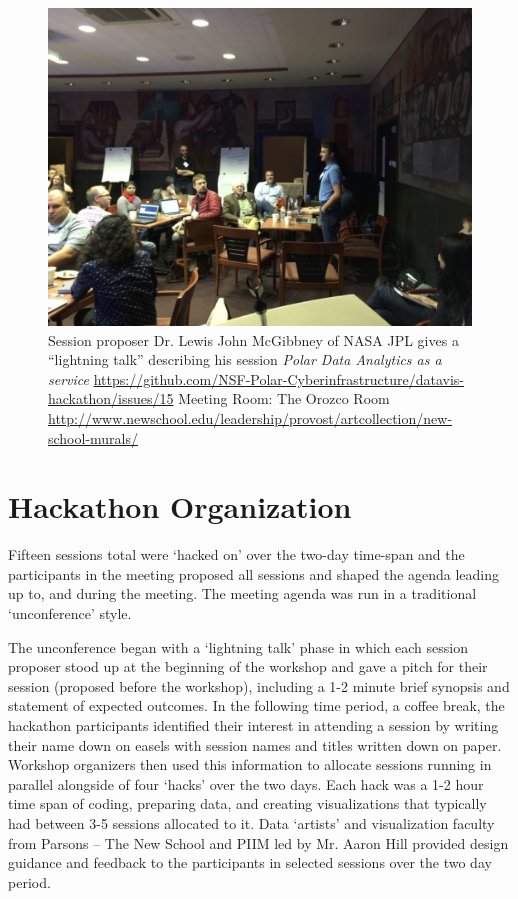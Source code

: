 \documentclass[11pt]{article}
\begin{document}
\begin{figure}[htp]
    \centering
    \includegraphics[width=5in]{figs/fig2.png}
    \caption{Session proposer Dr. Lewis John McGibbney of NASA JPL gives a ``lightning talk'' describing his session {\em Polar Data Analytics as a service} \protect\url{https://github.com/NSF-Polar-Cyberinfrastructure/datavis-hackathon/issues/15} Meeting Room: The Orozco Room \protect\url{http://www.newschool.edu/leadership/provost/artcollection/new-school-murals/}}
    \label{fig:lightning}
\end{figure}


\section{Hackathon Organization}
Fifteen sessions total were `hacked on' over the two-day time-span and the participants in the meeting proposed all sessions and shaped the agenda leading up to, and during the meeting. The meeting agenda was run in a traditional `unconference' style. 

The unconference began with a `lightning talk' phase in which each session proposer stood up at the beginning of the workshop and gave a pitch for their session (proposed before the workshop), including a 1-2 minute brief synopsis and statement of expected outcomes. In the following time period, a coffee break, the hackathon participants identified their interest in attending a session by writing their name down on easels with session names and titles written down on paper. Workshop organizers then used this information to allocate sessions running in parallel alongside of four `hacks' over the two days. Each hack was a 1-2 hour time span of coding, preparing data, and creating visualizations that typically had between 3-5 sessions allocated to it. Data `artists' and visualization faculty from Parsons -- The New School and PIIM led by Mr. Aaron Hill provided design guidance and feedback to the participants in selected sessions over the two day period.
\end{document}
